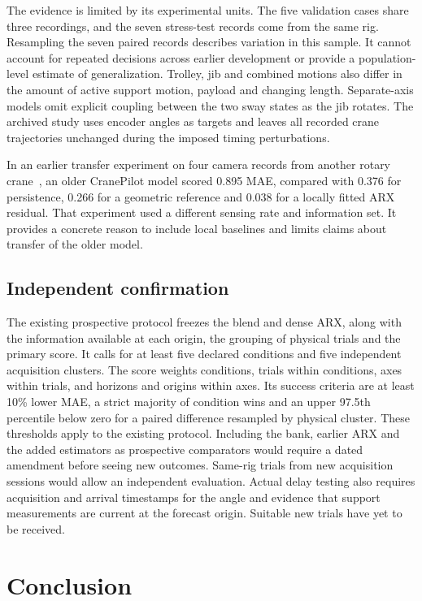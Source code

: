 The evidence is limited by its experimental units. The five validation cases share three recordings, and the seven stress-test records come from the same rig. Resampling the seven paired records describes variation in this sample. It cannot account for repeated decisions across earlier development or provide a population-level estimate of generalization. Trolley, jib and combined motions also differ in the amount of active support motion, payload and changing length. Separate-axis models omit explicit coupling between the two sway states as the jib rotates. The archived study uses encoder angles as targets and leaves all recorded crane trajectories unchanged during the imposed timing perturbations.

In an earlier transfer experiment on four camera records from another rotary crane~\cite{khemakhem2026}, an older CranePilot model scored 0.895\degs{} MAE, compared with 0.376\degs{} for persistence, 0.266\degs{} for a geometric reference and 0.038\degs{} for a locally fitted ARX residual. That experiment used a different sensing rate and information set. It provides a concrete reason to include local baselines and limits claims about transfer of the older model.

\subsection{Independent confirmation}

The existing prospective protocol freezes the blend and dense ARX, along with the information available at each origin, the grouping of physical trials and the primary score. It calls for at least five declared conditions and five independent acquisition clusters. The score weights conditions, trials within conditions, axes within trials, and horizons and origins within axes. Its success criteria are at least 10\% lower MAE, a strict majority of condition wins and an upper 97.5th percentile below zero for a paired difference resampled by physical cluster. These thresholds apply to the existing protocol. Including the bank, earlier ARX and the added estimators as prospective comparators would require a dated amendment before seeing new outcomes. Same-rig trials from new acquisition sessions would allow an independent evaluation. Actual delay testing also requires acquisition and arrival timestamps for the angle and evidence that support measurements are current at the forecast origin. Suitable new trials have yet to be received.

\section{Conclusion}

